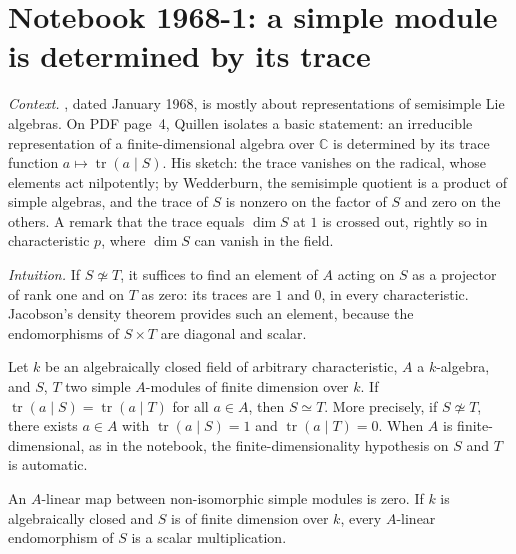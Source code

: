 \section[Notebook 1968-1: a simple module is determined by its trace]{Notebook 1968-1: a simple module is determined by its trace\protect{}}\label{sec:quillen-1968-1}

\emph{Context.} , dated January 1968, is mostly about representations of semisimple Lie algebras. On PDF page~4, Quillen isolates a basic statement: an irreducible representation of a finite-dimensional algebra over $\mathbb{C}$ is determined by its trace function $a \mapsto \operatorname{tr}(a \mid S)$. His sketch: the trace vanishes on the radical, whose elements act nilpotently; by Wedderburn, the semisimple quotient is a product of simple algebras, and the trace of $S$ is nonzero on the factor of $S$ and zero on the others. A remark that the trace equals $\dim S$ at $1$ is crossed out, rightly so in characteristic $p$, where $\dim S$ can vanish in the field.

\emph{Intuition.} If $S \not\simeq T$, it suffices to find an element of $A$ acting on $S$ as a projector of rank one and on $T$ as zero: its traces are $1$ and $0$, in every characteristic. Jacobson's density theorem provides such an element, because the endomorphisms of $S \times T$ are diagonal and scalar.

\begin{encadre}
\begin{theoreme}\label{thm:quillen-1968-1}
Let $k$ be an algebraically closed field of arbitrary characteristic, $A$ a $k$-algebra, and $S$, $T$ two simple $A$-modules of finite dimension over $k$. If $\operatorname{tr}(a \mid S) = \operatorname{tr}(a \mid T)$ for all $a \in A$, then $S \simeq T$. More precisely, if $S \not\simeq T$, there exists $a \in A$ with $\operatorname{tr}(a \mid S) = 1$ and $\operatorname{tr}(a \mid T) = 0$. When $A$ is finite-dimensional, as in the notebook, the finite-dimensionality hypothesis on $S$ and $T$ is automatic.
\end{theoreme}
\end{encadre}

\begin{lemme}[Schur]\label{lem:quillen-1968-1-schur}
An $A$-linear map between non-isomorphic simple modules is zero. If $k$ is algebraically closed and $S$ is of finite dimension over $k$, every $A$-linear endomorphism of $S$ is a scalar multiplication.
\end{lemme}


